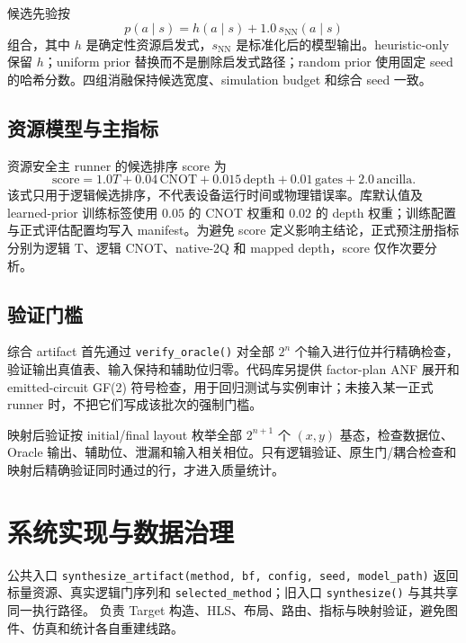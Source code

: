 \documentclass[UTF8,a4paper,12pt]{ctexart}
\begin{document}
候选先验按
\begin{equation}
  p(a\mid s)=h(a\mid s)+1.0\,s_{\mathrm{NN}}(a\mid s)
  \label{eq:prior}
\end{equation}
组合，其中 $h$ 是确定性资源启发式，$s_{\mathrm{NN}}$ 是标准化后的模型输出。heuristic-only 保留 $h$；uniform prior 替换而不是删除启发式路径；random prior 使用固定 seed 的哈希分数。四组消融保持候选宽度、simulation budget 和综合 seed 一致。

\subsection{资源模型与主指标}

资源安全主 runner 的候选排序 score 为
\begin{equation}
  \mathrm{score}=1.0T+0.04\,\mathrm{CNOT}+0.015\,\mathrm{depth}
  +0.01\,\mathrm{gates}+2.0\,\mathrm{ancilla}.
  \label{eq:score}
\end{equation}
该式只用于逻辑候选排序，不代表设备运行时间或物理错误率。库默认值及 learned-prior 训练标签使用 $0.05$ 的 CNOT 权重和 $0.02$ 的 depth 权重；训练配置与正式评估配置均写入 manifest。为避免 score 定义影响主结论，正式预注册指标分别为逻辑 T、逻辑 CNOT、native-2Q 和 mapped depth，score 仅作次要分析。

\subsection{验证门槛}

综合 artifact 首先通过 \texttt{verify\_oracle()} 对全部 $2^n$ 个输入进行位并行精确检查，验证输出真值表、输入保持和辅助位归零。代码库另提供 factor-plan ANF 展开和 emitted-circuit GF(2) 符号检查，用于回归测试与实例审计；未接入某一正式 runner 时，不把它们写成该批次的强制门槛。

映射后验证按 initial/final layout 枚举全部 $2^{n+1}$ 个 $(x,y)$ 基态，检查数据位、Oracle 输出、辅助位、泄漏和输入相关相位。只有逻辑验证、原生门/耦合检查和映射后精确验证同时通过的行，才进入质量统计。

\section{系统实现与数据治理}

公共入口 \texttt{synthesize\_artifact(method, bf, config, seed, model\_path)} 返回标量资源、真实逻辑门序列和 \texttt{selected\_method}；旧入口 \texttt{synthesize()} 与其共享同一执行路径。 负责 Target 构造、HLS、布局、路由、指标与映射验证，避免图件、仿真和统计各自重建线路。
\end{document}
